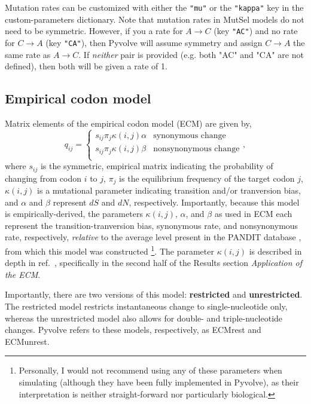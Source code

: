 \documentclass{article}
\newcommand{\code}[1]{\texttt{\small{#1}}}
\begin{document}
Mutation rates can be customized with either the \code{"mu"} or the \code{"kappa"} key in the custom-parameters dictionary. Note that mutation rates in MutSel models do not need to be symmetric. However, if you a rate for $A \rightarrow C$ (key \code{"AC"}) and no rate for $C \rightarrow A$ (key \code{"CA"}), then Pyvolve will assume symmetry and assign $C \rightarrow A$ the same rate as $A \rightarrow C$. If \emph{neither} pair is provided (e.g. both "AC" and "CA" are not defined), then both will be given a rate of 1.



\subsection{Empirical codon model}\label{sec:ecm}

Matrix elements of the empirical codon model (ECM) \citep{ECM} are given by,
\begin{equation}\label{eq:ecmrest}
q_{ij} = \left\{
\begin{array}{rl}
s_{ij} \pi_j \kappa(i,j) \alpha      &\text{synonymous change} \\
s_{ij} \pi_j \kappa(i,j) \beta       &\text{nonsynonymous change} \\
\end{array} \right.,
\end{equation}
where $s_{ij}$ is the symmetric, empirical matrix indicating the probability of changing from codon $i$ to $j$, $\pi_j$ is the equilibrium frequency of the target codon $j$, $\kappa(i,j)$ is a mutational parameter indicating transition and/or tranversion bias, and $\alpha$ and $\beta$ represent $dS$ and $dN$, respectively. Importantly, because this model is empirically-derived, the parameters $\kappa(i,j)$, $\alpha$, and $\beta$ as used in ECM each represent the transition-tranversion bias, synonymous rate, and nonsynonymous rate, respectively, \emph{relative} to the average level present in the PANDIT database \citep{PANDIT2006}, from which this model was constructed \footnote{Personally, I would not recommend using any of these parameters when simulating (although they have been fully implemented in Pyvolve), as their interpretation is neither straight-forward nor particularly biological.}. The parameter $\kappa(i,j)$ is described in depth in ref.\ \citep{ECM}, specifically in the second half of the Results section \emph{Application of the ECM}.

Importantly, there are two versions of this model: \textbf{restricted} and \textbf{unrestricted}. The restricted model restricts instantaneous change to single-nucleotide only, whereas the unrestricted model also allows for double- and triple-nucleotide changes. Pyvolve refers to these models, respectively, as ECMrest and ECMunrest.
\end{document}
